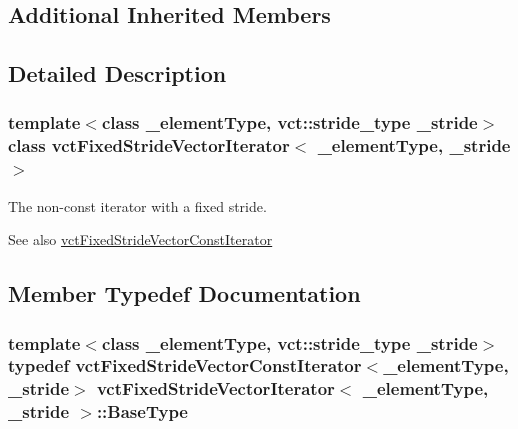 \subsection*{Additional Inherited Members}


\subsection{Detailed Description}
\subsubsection*{template$<$class \+\_\+element\+Type, vct\+::stride\+\_\+type \+\_\+stride$>$class vct\+Fixed\+Stride\+Vector\+Iterator$<$ \+\_\+element\+Type, \+\_\+stride $>$}

The non-\/const iterator with a fixed stride. \begin{DoxySeeAlso}{See also}
\hyperlink{classvct_fixed_stride_vector_const_iterator}{vct\+Fixed\+Stride\+Vector\+Const\+Iterator} 
\end{DoxySeeAlso}


\subsection{Member Typedef Documentation}
\hypertarget{classvct_fixed_stride_vector_iterator_a3f9c3435364bd43064a82e9b1446f3be}{}
\subsubsection[{Base\+Type}]{\setlength{\rightskip}{0pt plus 5cm}template$<$class \+\_\+element\+Type, vct\+::stride\+\_\+type \+\_\+stride$>$ typedef {\bf vct\+Fixed\+Stride\+Vector\+Const\+Iterator}$<$\+\_\+element\+Type, \+\_\+stride$>$ {\bf vct\+Fixed\+Stride\+Vector\+Iterator}$<$ \+\_\+element\+Type, \+\_\+stride $>$\+::{\bf Base\+Type}}\label{classvct_fixed_stride_vector_iterator_a3f9c3435364bd43064a82e9b1446f3be}
\hypertarget{classvct_fixed_stride_vector_iterator_a2f2031bcd38f41975bc90a9f3b8af46f}{}
